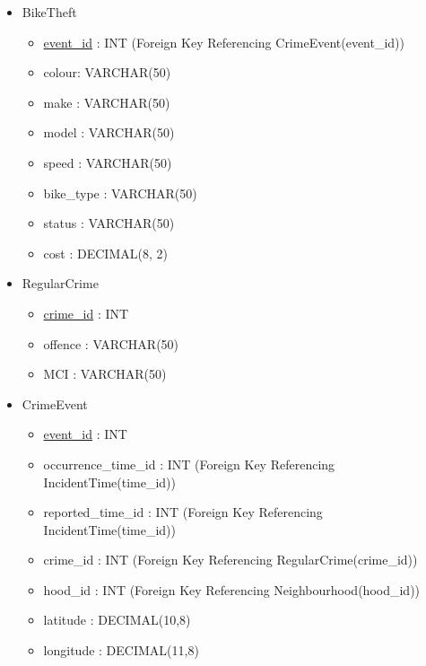 \documentclass[12pt, a4paper]{article}
\begin{document}
\begin{itemize}
\begin{itemize}
    \end{itemize}
    \item BikeTheft
        \begin{itemize}
        \item \underline{event\_id} :  \color{blue} INT \color{black} (Foreign Key Referencing CrimeEvent(event\_id))
        \item colour: \color{blue} VARCHAR(50) \color{black}
        \item make : \color{blue} VARCHAR(50) \color{black}
        \item model : \color{blue}  VARCHAR(50) \color{black}
        \item speed : \color{blue} VARCHAR(50) \color{black}
        \item bike\_type : \color{blue} VARCHAR(50) \color{black}
        \item status : \color{blue} VARCHAR(50) \color{black}
        \item cost : \color{blue} DECIMAL(8, 2) \color{black}
    \end{itemize}
    \item RegularCrime
        \begin{itemize}
        \item \underline{crime\_id} : \color{blue} INT \color{black}
        \item offence : \color{blue} VARCHAR(50) \color{black}
        \item MCI : \color{blue} VARCHAR(50) \color{black}
    \end{itemize}
    \item CrimeEvent
        \begin{itemize}
        \item \underline{event\_id} :  \color{blue} INT \color{black}
        \item occurrence\_time\_id :  \color{blue} INT \color{black} (Foreign Key Referencing IncidentTime(time\_id))
        \item reported\_time\_id : \color{blue} INT \color{black} (Foreign Key Referencing IncidentTime(time\_id))
        \item crime\_id : \color{blue} INT \color{black} (Foreign Key Referencing RegularCrime(crime\_id))
        \item hood\_id : \color{blue} INT \color{black} (Foreign Key Referencing Neighbourhood(hood\_id))
        \item latitude : \color{blue} DECIMAL(10,8) \color{black}
        \item longitude : \color{blue} DECIMAL(11,8) \color{black}

\end{itemize}
\end{itemize}
\end{document}
